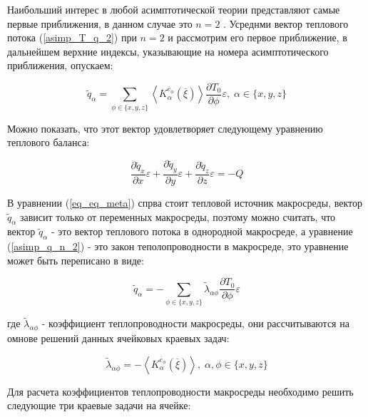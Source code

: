 Наибольший интерес в любой асимптотической теории представляют самые первые приближения, в данном случае это 
$n=2$
. Усреднми вектор теплового потока 
(\ref{asimp_T_q_2})
при 
$n=2$
и рассмотрим его первое приближение, в дальнейшем верхние индексы, указывающие на номера асимптотического приближения, опускаем:

\begin{equation}
    \label{asimp_q_n_2}
    \widetilde{q}_{\alpha} = 
    \sum_{\phi \in \{x,y,z\}} \left< K^{ \overline{e}_{\phi}}_{\alpha} \left( \overline{\xi} \right)  \right> 
    \frac{\partial T_0}{\partial \phi} \varepsilon
    , \; \alpha \in \{x,y,z\}
\end{equation}

Можно показать, что этот вектор удовлетворяет следующему уравнению теплового баланса:

\begin{equation}
    \label{eq_eq_meta}
    \frac{\partial \widetilde{q}_x}{\partial x}\varepsilon + 
    \frac{\partial \widetilde{q}_y}{\partial y}\varepsilon + 
    \frac{\partial \widetilde{q}_z}{\partial z}\varepsilon = -Q
\end{equation}

В уравнении 
(\ref{eq_eq_meta}) 
спрва стоит тепловой источник макросреды, вектор 
$ \widetilde{q}_{\alpha}$ 
зависит только от переменных макросреды, поэтому можно считать, 
что вектор 
$ \widetilde{q}_{\alpha}$ 
- это вектор теплового потока в однородной макросреде, а уравнение 
(\ref{asimp_q_n_2}) 
- это закон теполопроводности в макросреде, это уравнение может быть переписано
в виде:

\begin{equation}
    \widetilde{q}_{\alpha} = - \sum_{ \phi \in \{x,y,z\} } \widetilde{\lambda}_{\alpha\phi} \frac{\partial T_0}{\partial \phi} \varepsilon
\end{equation}

где 
$ \widetilde{\lambda}_{\alpha\phi}$ 
- коэффициент теплопроводности макросреды, они рассчитываются на омнове решений данных ячейковых краевых задач:

\begin{equation}
    \widetilde{\lambda}_{\alpha\phi} = - \left< K^{ \overline{e}_{\phi}}_{\alpha} \left( \overline{\xi} \right) \right> 
    , \; \alpha,\phi \in \{x,y,z\} 
\end{equation}

Для расчета коэффициентов теплопроводности макросреды необходимо решить следующие три краевые задачи на ячейке:

